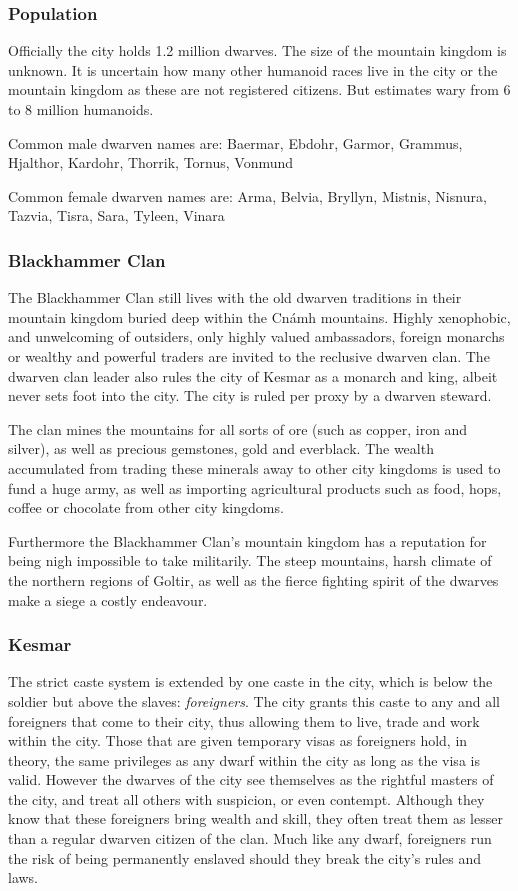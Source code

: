 \subsubsection{Population}

Officially the city holds 1.2 million dwarves. The size of the mountain
kingdom is unknown. It is uncertain how many other humanoid races live in
the city or the mountain kingdom as these are not registered citizens. But
estimates wary from 6 to 8 million humanoids.

Common male dwarven names are: Baermar, Ebdohr, Garmor, Grammus, Hjalthor,
Kardohr, Thorrik, Tornus, Vonmund

Common female dwarven names are: Arma, Belvia, Bryllyn, Mistnis, Nisnura, Tazvia,
Tisra, Sara, Tyleen, Vinara

\subsubsection{Blackhammer Clan}
\label{sec:Blackhammer Clan}

The Blackhammer Clan still lives with the old dwarven traditions in their
mountain kingdom buried deep within the Cnámh mountains. Highly xenophobic,
and unwelcoming of outsiders, only highly valued ambassadors, foreign monarchs
or wealthy and powerful traders are invited to the reclusive dwarven clan. The
dwarven clan leader also rules the city of Kesmar as a monarch and king,
albeit never sets foot into the city. The city is ruled per proxy by a dwarven
steward.

The clan mines the mountains for all sorts of ore (such as copper, iron and
silver), as well as precious gemstones, gold and everblack. The wealth
accumulated from trading these minerals away to other city kingdoms is used to
fund a huge army, as well as importing agricultural products such as food,
hops, coffee or chocolate from other city kingdoms.

Furthermore the Blackhammer Clan's mountain kingdom has a reputation for being
nigh impossible to take militarily. The steep mountains, harsh climate of the
northern regions of Goltir, as well as the fierce fighting spirit of the dwarves
make a siege a costly endeavour.

\subsubsection{Kesmar}

The strict caste system is extended by one caste in the city, which is below
the soldier but above the slaves: \emph{foreigners}. The city grants this
caste to any and all foreigners that come to their city, thus allowing them to
live, trade and work within the city. Those that are given temporary visas as
foreigners hold, in theory, the same privileges as any dwarf within the city
as long as the visa is valid. However the dwarves of the city see themselves
as the rightful masters of the city, and treat all others with suspicion, or
even contempt. Although they know that these foreigners bring wealth and skill,
they often treat them as lesser than a regular dwarven citizen of the clan.
Much like any dwarf, foreigners run the risk of being permanently enslaved
should they break the city's rules and laws.

